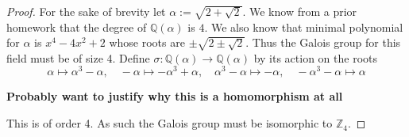 \documentclass[10pt]{article}
\newcommand{\sk}{\vskip 10mm}
\newcommand{\bb}[1]{\mathbb{#1}}
\theoremstyle{remark}
\theoremstyle{remark}
\begin{document}
\begin{proof}
  For the sake of brevity let $\alpha:=\sqrt{2+\sqrt{2}}$.
  We know from a prior homework that the degree of $\bb{Q}(\alpha)$
  is $4$. We also know that minimal polynomial for $\alpha$ is
  $x^4-4x^2+2$ whose roots are $\pm\sqrt{2\pm\sqrt{2}}$. Thus the Galois group
  for this field must be of size 4. Define $\sigma:\bb{Q}(\alpha)\rightarrow\bb{Q}(\alpha)$ by
  its action on the roots
  \[\alpha\mapsto\alpha^3-\alpha,\quad-\alpha\mapsto-\alpha^3+\alpha,\quad\alpha^3-\alpha\mapsto-\alpha,\quad-\alpha^3-\alpha\mapsto\alpha \]

  \textbf{Probably want to justify why this is a homomorphism at all}
  
  This is of order 4. As such the Galois group must be isomorphic to
  $\bb{Z}_4$.
\end{proof}

\sk

\end{document}
